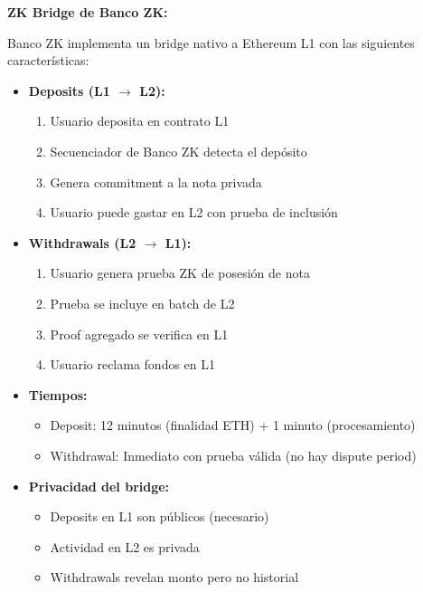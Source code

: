\documentclass[11pt,a4paper,twoside]{book}
\begin{document}
\begin{bancozk}
\textbf{ZK Bridge de Banco ZK:}

Banco ZK implementa un bridge nativo a Ethereum L1 con las siguientes caracter\'isticas:

\begin{itemize}
    \item \textbf{Deposits (L1 $\to$ L2):}
    \begin{enumerate}
        \item Usuario deposita en contrato L1
        \item Secuenciador de Banco ZK detecta el dep\'osito
        \item Genera commitment a la nota privada
        \item Usuario puede gastar en L2 con prueba de inclusi\'on
    \end{enumerate}
    
    \item \textbf{Withdrawals (L2 $\to$ L1):}
    \begin{enumerate}
        \item Usuario genera prueba ZK de posesi\'on de nota
        \item Prueba se incluye en batch de L2
        \item Proof agregado se verifica en L1
        \item Usuario reclama fondos en L1
    \end{enumerate}
    
    \item \textbf{Tiempos:}
    \begin{itemize}
        \item Deposit: 12 minutos (finalidad ETH) + 1 minuto (procesamiento)
        \item Withdrawal: Inmediato con prueba v\'alida (no hay dispute period)
    \end{itemize}
    
    \item \textbf{Privacidad del bridge:}
    \begin{itemize}
        \item Deposits en L1 son p\'ublicos (necesario)
        \item Actividad en L2 es privada
        \item Withdrawals revelan monto pero no historial
    \end{itemize}
\end{itemize}
\end{bancozk}
\end{document}
